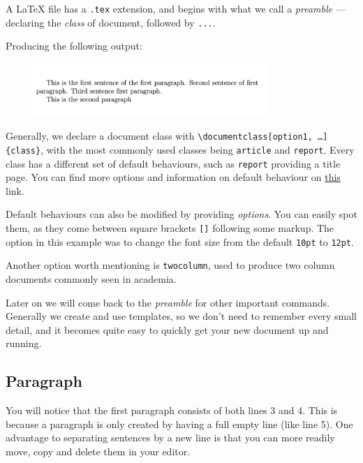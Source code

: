 A LaTeX file has a \verb|.tex| extension, and begins with what we call a \emph{preamble} --- declaring the \emph{class} of document, followed by \verb|...|.


Producing the following output:

\begin{figure}[h]
    \centering
    \includegraphics[width=0.8\textwidth]{figures/chapters.png}
    \label{fig:chapters}
\end{figure}

Generally, we declare a document class with \texttt{\textbackslash documentclass[option1, \ldots]\{class\}}, with the most commonly used classes being \verb|article| and \verb|report|.
Every class has a different set of default behaviours, such as \texttt{report} providing a title page.
You can find more options and information on default behaviour on \href{https://texblog.org/2013/02/13/latex-documentclass-options-illustrated/}{this} link.

Default behaviours can also be modified by providing \emph{options}.
You can easily spot them, as they come between square brackets \verb|[]| following some markup.
The option in this example was to change the font size from the default \verb|10pt| to \verb|12pt|.

Another option worth mentioning is \verb|twocolumn|, used to produce two column documents commonly seen in academia.

Later on we will come back to the \emph{preamble} for other important commands.
Generally we create and use templates, so we don't need to remember every small detail, and it becomes quite easy to quickly get your new document up and running.

\subsection{Paragraph}
You will notice that the first paragraph consists of both lines 3 and 4.
This is because a paragraph is only created by having a full empty line (like line 5).
One advantage to separating sentences by a new line is that you can more readily move, copy and delete them in your editor.

